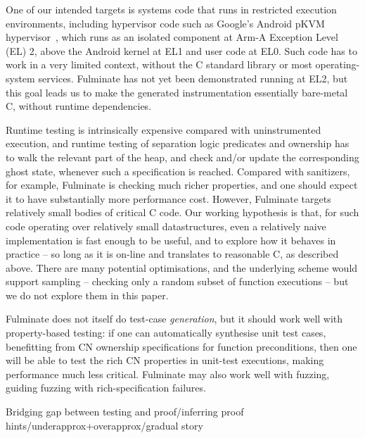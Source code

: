 \documentclass[withindex,glossary]{cam-thesis}
\begin{document}
{%

One of our intended targets is systems code that runs in restricted execution environments, including hypervisor code such as Google's Android pKVM hypervisor~\cite{pKVM-linux-talk}, which runs as an isolated component at Arm-A Exception Level (EL) 2, above the Android kernel at EL1 and user code at EL0. 
Such code has to work in a very limited context, without the C standard library or most operating-system services. Fulminate has not yet been demonstrated running at EL2,
but this goal leads us to make the generated instrumentation essentially bare-metal C, without runtime dependencies.


%
Runtime testing is intrinsically expensive compared with uninstrumented execution, and runtime testing of separation logic predicates and ownership has to walk the relevant part of the heap, and check and/or update the corresponding ghost state, whenever such a specification is reached.  
%
Compared with sanitizers, for example, Fulminate is checking much richer properties, and one should expect it to have substantially more performance cost.
%
However, Fulminate targets relatively small bodies of critical C code. 
Our working hypothesis is that, for such code operating over relatively small datastructures, even a relatively naive implementation is fast enough to be useful, and to explore how it behaves in practice -- so long as it is on-line and translates to reasonable C, as described above.   There are many potential optimisations, and the underlying scheme would support sampling -- checking only a random subset of function executions -- but we do not explore them in this paper. 

Fulminate does not itself do test-case \emph{generation}, but it should work well with property-based testing: if one can automatically synthesise unit test cases, benefitting from CN ownership specifications for function preconditions, then one will be able to test the rich CN properties in unit-test executions, making performance much less critical.  Fulminate may also work well with fuzzing, guiding fuzzing with rich-specification failures.
}

Bridging gap between testing and proof/inferring proof hints/underapprox+overapprox/gradual story
\end{document}
